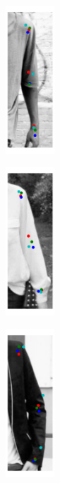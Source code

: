 \begin{figure}[t!]
    \centering
    \begin{subfigure}[b]{0.08\textwidth}
            \includegraphics[height=5.5cm]{resources/Fig_Variance/image_1}
    \end{subfigure}
  	\hfill
    \begin{subfigure}[b]{0.08\textwidth}
            \includegraphics[height=5.5cm]{resources/Fig_Variance/image_2}
    \end{subfigure}
    \hfill
    \begin{subfigure}[b]{0.08\textwidth}
            \includegraphics[height=5.5cm]{resources/Fig_Variance/image_4}

\end{subfigure}
\end{figure}
